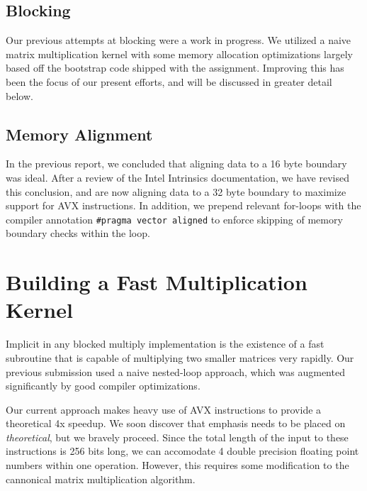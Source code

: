 \documentclass{scrartcl}
\begin{document}
    \subsection{Blocking}

    Our previous attempts at blocking were a work in progress. We utilized a naive matrix multiplication kernel with some memory allocation optimizations largely based off the bootstrap code shipped with the assignment. Improving this has been the focus of our present efforts, and will be discussed in greater detail below.

    \subsection{Memory Alignment}

    In the previous report, we concluded that aligning data to a 16 byte boundary was ideal. After a review of the Intel Intrinsics documentation, we have revised this conclusion, and are now aligning data to a 32 byte boundary to maximize support for AVX instructions. In addition, we prepend relevant for-loops with the compiler annotation \verb|#pragma vector aligned| to enforce skipping of memory boundary checks within the loop.
  \section{Building a Fast Multiplication Kernel}
  Implicit in any blocked multiply implementation is the existence of a fast subroutine that is capable of multiplying two smaller matrices very rapidly. Our previous submission used a naive nested-loop approach, which was augmented significantly by good compiler optimizations.

  Our current approach makes heavy use of AVX instructions to provide a theoretical 4x speedup. We soon discover that emphasis needs to be placed on \emph{theoretical}, but we bravely proceed. Since the total length of the input to these instructions is 256 bits long, we can accomodate 4 double precision floating point numbers within one operation. However, this requires some modification to the cannonical matrix multiplication algorithm.
\end{document}

